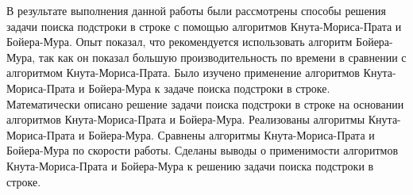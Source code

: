 \documentclass[../main.tex]{subfiles}
\begin{document}
	
	В результате выполнения данной работы были рассмотрены способы решения задачи поиска подстроки в строке с помощью алгоритмов Кнута-Мориса-Прата и Бойера-Мура. 
	Опыт показал, что рекомендуется использовать алгоритм Бойера-Мура, так как он показал большую производительность по времени в сравнении с алгоритмом Кнута-Мориса-Прата. 
	Было изучено применение алгоритмов Кнута-Мориса-Прата и Бойера-Мура к задаче поиска подстроки в строке. 
	Математически описано решение задачи поиска подстроки в строке на основании алгоритмов Кнута-Мориса-Прата и Бойера-Мура. 
	Реализованы алгоритмы Кнута-Мориса-Прата и Бойера-Мура.  Сравнены алгоритмы Кнута-Мориса-Прата и Бойера-Мура по скорости работы. 
	Сделаны выводы о применимости алгоритмов Кнута-Мориса-Прата и Бойера-Мура к решению задачи поиска подстроки в строке.
	
\end{document}
